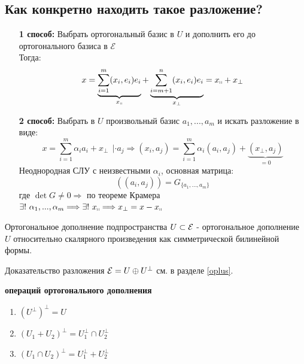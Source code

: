 \subsection*{Как конкретно находить такое разложение?}
\begin{itemize}
    \item[\textbf{1 способ:}] Выбрать ортогональный базис в $U$ и дополнить его до ортогонального базиса в $\mathcal{E}$\\
    Тогда:
    $$x = \underbrace{\sum \limits_{i=1}^m(x_i,e_i)e_i}_{x_\shortparallel}  + \underbrace{\sum \limits_{i=m+1}^n(x_i,e_i)e_i}_{x_\perp} = x_\shortparallel + x_\perp$$
    \item[\textbf{2 способ:}] Выбрать в $U$ произвольный базис $a_1,...,a_m$ и искать разложение в виде:
    $$x = \sum \limits_{i=1}^m \alpha_ia_i + x_\perp \ \ | \cdot a_j \Longrightarrow (x_i,a_j) = \sum \limits_{i=1}^m \alpha_i(a_i,a_j) + \underbrace{(x_\perp, a_j)}_{=0} $$
    Неоднородная СЛУ с неизвестными $\alpha_i$, основная матрица: 
    $$((a_i,a_j)) = G_{\{a_1,...,a_m\}}$$
    где $\det G \neq 0 \Longrightarrow$ по теореме Крамера $\exists ! \ \alpha_1,...,\alpha_m \Longrightarrow \exists ! \ x_\shortparallel \Longrightarrow x_\perp = x - x_\shortparallel$   
\end{itemize}
\begin{definition}
    Ортогональное дополнение подпространства $U \subset \mathcal{E}$ - ортогональное дополнение $U$ относительно скалярного произведения как симметрической билинейной формы.
\end{definition}
\begin{remark}
    Доказательство разложения $\mathcal{E} = U \oplus U^\perp$ см. в разделе \ref{oplus}.
\end{remark}
\begin{properties} \textbf{операций ортогонального дополнения} 
    \begin{enumerate}
        \item $(U^\perp)^\perp = U$
        \item $(U_1 + U_2)^\perp = U_1^\perp \cap U_2^\perp$
        \item $(U_1 \cap U_2)^\perp = U_1^\perp + U_2^\perp$
    \end{enumerate}
\end{properties}
